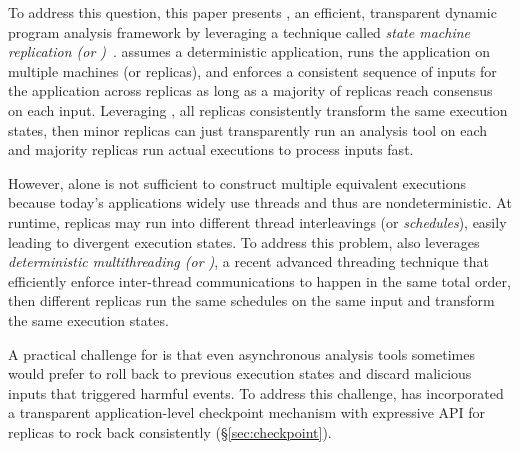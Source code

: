 

To address this question, this paper presents \xxx, an efficient, 
transparent dynamic program analysis framework by leveraging a technique called 
\emph{state machine replication (or \smr)}~\cite{paxos:simple, 
paxos:practical, paxos}. \smr assumes a deterministic application, runs the 
application on multiple machines (or replicas), and enforces a consistent 
sequence of inputs for the application across replicas as long as a majority of 
replicas reach consensus on each input. Leveraging \smr, all replicas
consistently transform the same execution states, then minor replicas can just
transparently run an analysis tool on each and majority
replicas run actual executions to process inputs fast.


However, \smr alone is not sufficient to construct multiple equivalent 
executions because today's applications widely use threads and thus are 
nondeterministic. At runtime, replicas may run into different thread
interleavings (or \emph{schedules}), easily leading to divergent execution
states. To address this problem, \xxx also leverages \emph{deterministic
multithreading (or \dmt)}, a recent advanced threading technique that
efficiently enforce inter-thread communications to happen in the same total
order, then different replicas run the same schedules on the same input and
transform the same execution states.


A practical challenge for \xxx is that even asynchronous analysis tools
sometimes would prefer to roll back to previous execution states and discard 
malicious inputs that triggered harmful events. To address this challenge, \xxx 
has incorporated a transparent application-level checkpoint mechanism with 
expressive API for replicas to rock back consistently (\S\ref{sec:checkpoint}).


